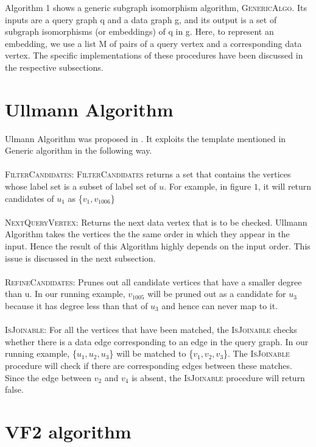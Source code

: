 Algorithm 1 shows a generic subgraph isomorphism algorithm, \textsc{GenericAlgo}. Its inputs are a query graph q and a data graph g, and its output is a set of subgraph isomorphisms (or embeddings) of q in g. Here, to represent an embedding, we use a list M of pairs of a query vertex and a corresponding data vertex. The specific implementations of these procedures have been discussed in the respective subsections.

\section{Ullmann Algorithm}

Ulmann Algorithm was proposed in \cite{ullmann}. It exploits the template mentioned in Generic algorithm in the following way.\\
\\
\textsc{FilterCandidates:} \textsc{FilterCandidates} returns a set that contains the vertices whose label set is a subset of label set of $u$. For example, in figure $1$, it will return candidates of $u_1$ as \{$v_1, v_{1006}$\}\\
\\
\textsc{NextQueryVertex:} Returns the next data vertex that is to be checked. Ullmann Algorithm takes the vertices the the same order in which they appear in the input. Hence the result of this Algorithm highly depends on the input order. This issue is discussed in the next subsection.\\
\\
\textsc{RefineCandidates:} Prunes out all candidate vertices that have a smaller degree than u. In our running example, $v_{1005}$ will be pruned out as a candidate for $u_3$ because it has degree less than that of $u_3$ and hence can never map to it.\\
\\
\textsc{IsJoinable:} For all the vertices that have been matched, the \textsc{IsJoinable} checks whether there is a data edge corresponding to an edge in the query graph. In our running example, \{$u_1, u_2, u_3$\} will be matched to \{$v_1, v_2, v_3$\}. The \textsc{IsJoinable} procedure will check if there are corresponding edges between these matches. Since the edge between $v_2$ and $v_4$ is absent, the \textsc{IsJoinable} procedure will return false.

\section{VF2 algorithm}

